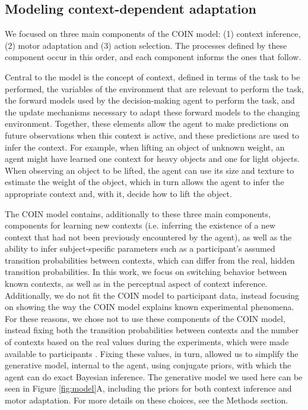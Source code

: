 \documentclass[a4paper,doc,floatsintext,natbib]{apa6}%
\def \fref #1{Figure \ref{#1}}     %
\begin{document}
\subsection{Modeling context-dependent adaptation}
We focused on three main components of the COIN model: (1) context inference, (2) motor adaptation and (3) action selection. The processes defined by these component occur in this order, and each component informs the ones that follow.

Central to the model is the concept of context, defined in terms of the task to be performed, the variables of the environment that are relevant to perform the task, the forward models used by the decision-making agent to perform the task, and the update mechanisms necessary to adapt these forward models to the changing environment. Together, these elements allow the agent to make predictions on future observations when this context is active, and these predictions are used to infer the context. For example, when lifting an object of unknown weight, an agent might have learned one context for heavy objects and one for light objects. When observing an object to be lifted, the agent can use its size and texture to estimate the weight of the object, which in turn allows the agent to infer the appropriate context and, with it, decide how to lift the object.

The COIN model contains, additionally to these three main components, components for learning new contexts (i.e. inferring the existence of a new context that had not been previously encountered by the agent), as well as the ability to infer subject-specific parameters such as a participant's assumed transition probabilities between contexts, which can differ from the real, hidden transition probabilities. In this work, we focus on switching behavior between known contexts, as well as in the perceptual aspect of context inference. Additionally, we do not fit the COIN model to participant data, instead focusing on showing the way the COIN model explains known experimental phenomena. For these reasons, we chose not to use these components of the COIN model, instead fixing both the transition probabilities between contexts and the number of contexts based on the real values during the experiments, which were made available to participants . Fixing these values, in turn, allowed us to simplify the generative model, internal to the agent, using conjugate priors, with which the agent can do exact Bayesian inference. The generative model we used here can be seen in \fref{fig:model}A, including the priors for both context inference and motor adaptation. For more details on these choices, see the Methods section.
\end{document}
